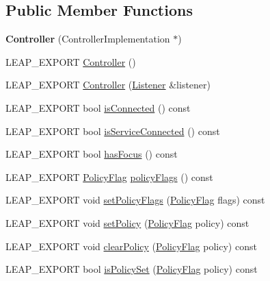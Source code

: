 \subsection*{Public Member Functions}
\begin{DoxyCompactItemize}
\item 
\mbox{\label{class_leap_1_1_controller_a356eee86e8cd232b3f6829986a64add5}} 
{\bfseries Controller} (Controller\+Implementation $\ast$)
\item 
L\+E\+A\+P\+\_\+\+E\+X\+P\+O\+RT \hyperlink{class_leap_1_1_controller_af5867527cc80ad805597a285eaf3d406}{Controller} ()
\item 
L\+E\+A\+P\+\_\+\+E\+X\+P\+O\+RT \hyperlink{class_leap_1_1_controller_a046b09a621c480a46b3783551191abbb}{Controller} (\hyperlink{class_leap_1_1_listener}{Listener} \&listener)
\item 
L\+E\+A\+P\+\_\+\+E\+X\+P\+O\+RT bool \hyperlink{class_leap_1_1_controller_a38835f744f2c56ae8914378b75085f14}{is\+Connected} () const
\item 
L\+E\+A\+P\+\_\+\+E\+X\+P\+O\+RT bool \hyperlink{class_leap_1_1_controller_a5162678b59f1b08b5ffb33c3a8754a76}{is\+Service\+Connected} () const
\item 
L\+E\+A\+P\+\_\+\+E\+X\+P\+O\+RT bool \hyperlink{class_leap_1_1_controller_aa0e6ba72fc7f8c12137d6277548da0ec}{has\+Focus} () const
\item 
L\+E\+A\+P\+\_\+\+E\+X\+P\+O\+RT \hyperlink{class_leap_1_1_controller_a0bdb49fa94aa2da8b098c1ac296528d6}{Policy\+Flag} \hyperlink{class_leap_1_1_controller_a5861fb4c3b26cb48bc12a3e9cc9eaf93}{policy\+Flags} () const
\item 
L\+E\+A\+P\+\_\+\+E\+X\+P\+O\+RT void \hyperlink{class_leap_1_1_controller_a39499e27cca45521f1f8c4d7bbd66adf}{set\+Policy\+Flags} (\hyperlink{class_leap_1_1_controller_a0bdb49fa94aa2da8b098c1ac296528d6}{Policy\+Flag} flags) const
\item 
L\+E\+A\+P\+\_\+\+E\+X\+P\+O\+RT void \hyperlink{class_leap_1_1_controller_a5854109f9466b9b2b4638592450160a9}{set\+Policy} (\hyperlink{class_leap_1_1_controller_a0bdb49fa94aa2da8b098c1ac296528d6}{Policy\+Flag} policy) const
\item 
L\+E\+A\+P\+\_\+\+E\+X\+P\+O\+RT void \hyperlink{class_leap_1_1_controller_a8640acf31dfcb70a86329f79f0a9efc0}{clear\+Policy} (\hyperlink{class_leap_1_1_controller_a0bdb49fa94aa2da8b098c1ac296528d6}{Policy\+Flag} policy) const
\item 
L\+E\+A\+P\+\_\+\+E\+X\+P\+O\+RT bool \hyperlink{class_leap_1_1_controller_a75bfba23a30619a3514fa1d654b4df29}{is\+Policy\+Set} (\hyperlink{class_leap_1_1_controller_a0bdb49fa94aa2da8b098c1ac296528d6}{Policy\+Flag} policy) const

\end{DoxyCompactItemize}
